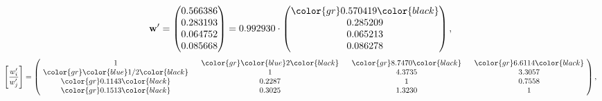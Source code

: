 \begin{example}
\begin{equation*}
\mathbf{w}^{\prime} =
\begin{pmatrix}
0.566386\\
0.283193\\
0.064752\\
0.085668
\end{pmatrix} =
0.992930\cdot
\begin{pmatrix}
\color{gr} 0.570419\color{black} \\
0.285209\\
0.065213\\
0.086278
\end{pmatrix},
\end{equation*}
\begin{equation*}
\left[ \frac{{w}^{\prime}_i}{{w}^{\prime}_j} \right] =
\begin{pmatrix}
$\,\,$ 1 $\,\,$ & $\,\,$\color{gr} \color{blue} 2\color{black} $\,\,$ & $\,\,$\color{gr} 8.7470\color{black} $\,\,$ & $\,\,$\color{gr} 6.6114\color{black} $\,\,$ \\
$\,\,$\color{gr} \color{blue}  1/2\color{black} $\,\,$ & $\,\,$ 1 $\,\,$ & $\,\,$4.3735$\,\,$ & $\,\,$3.3057  $\,\,$ \\
$\,\,$\color{gr} 0.1143\color{black} $\,\,$ & $\,\,$0.2287$\,\,$ & $\,\,$ 1 $\,\,$ & $\,\,$0.7558 $\,\,$ \\
$\,\,$\color{gr} 0.1513\color{black} $\,\,$ & $\,\,$0.3025$\,\,$ & $\,\,$1.3230$\,\,$ & $\,\,$ 1  $\,\,$ \\
\end{pmatrix},
\end{equation*}
\end{example}
\newpage
